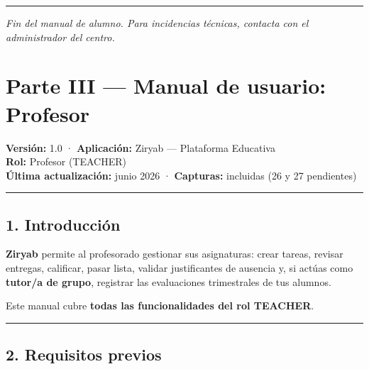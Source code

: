 \documentclass[
  spanish,
  11pt,
]{report}
\begin{document}
\begin{center}\rule{0.5\linewidth}{0.5pt}\end{center}

\emph{Fin del manual de alumno. Para incidencias técnicas, contacta con
el administrador del centro.}

\newpage

\chapter{Parte III --- Manual de usuario:
Profesor}\label{parte-iii-manual-de-usuario-profesor}

\textbf{Versión:} 1.0 · \textbf{Aplicación:} Ziryab --- Plataforma
Educativa\\
\textbf{Rol:} Profesor (TEACHER)\\
\textbf{Última actualización:} junio 2026 · \textbf{Capturas:} incluidas
(26 y 27 pendientes)

\begin{center}\rule{0.5\linewidth}{0.5pt}\end{center}

\section{1. Introducción}\label{introducciuxf3n-1}

\textbf{Ziryab} permite al profesorado gestionar sus asignaturas: crear
tareas, revisar entregas, calificar, pasar lista, validar justificantes
de ausencia y, si actúas como \textbf{tutor/a de grupo}, registrar las
evaluaciones trimestrales de tus alumnos.

Este manual cubre \textbf{todas las funcionalidades del rol TEACHER}.

\begin{center}\rule{0.5\linewidth}{0.5pt}\end{center}

\section{2. Requisitos previos}\label{requisitos-previos-1}
\end{document}

